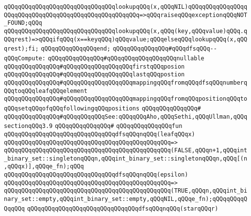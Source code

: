 \verb|qQQqqQQqqQQqqQQqqQQqqQQqqQQqqQQqlookupqQQq(x,qQQqNIL)qQQqqQQqqQQqqQQqqQQqqQQqqQQqqQQqqQQqqQQqqQQqqQQqqQQqqQQq=>qQQqraiseqQQqexceptionqQQqNOT_FOUND;qQQq|\newline
\verb|qQQqqQQqqQQqqQQqqQQqqQQqqQQqqQQqlookupqQQq(x,qQQq(key,qQQqvalue)qQQq.qQQqrest)=>qQQqifqQQq(x==keyqQQq)qQQqvalue;qQQqelseqQQqlookupqQQq(x,qQQqrest);fi;|\newline
\verb|qQQqqQQqqQQqqQQqend;|\newline
\newline
\verb|qQQqqQQqqQQqqQQq#qQQqdfsqQQq--qQQqCompute:|\newline
\verb|qQQqqQQqqQQqqQQq#qQQqqQQqqQQqqQQqqQQqnullable|\newline
\verb|qQQqqQQqqQQqqQQq#qQQqqQQqqQQqqQQqqQQqfirstqQQqposion|\newline
\verb|qQQqqQQqqQQqqQQq#qQQqqQQqqQQqqQQqqQQqlastqQQqpostion|\newline
\verb|qQQqqQQqqQQqqQQq#qQQqqQQqqQQqqQQqqQQqmappingqQQqfromqQQqdfsqQQqnumberqQQqtoqQQqleafqQQqelement|\newline
\verb|qQQqqQQqqQQqqQQq#qQQqqQQqqQQqqQQqqQQqmappingqQQqfromqQQqpositionqQQqtoqQQqsetqQQqofqQQqfollowingqQQqpositions|\newline
\verb|qQQqqQQqqQQqqQQq#|\newline
\verb|qQQqqQQqqQQqqQQq#qQQqqQQqqQQqSee:qQQqqQQqAho,qQQqSethi,qQQqUllman,qQQqsectionqQQq3.9|\newline
\verb|qQQqqQQqqQQqqQQq#|\newline
\verb|qQQqqQQqqQQqqQQqfun|\newline
\verb|qQQqqQQqqQQqqQQqqQQqqQQqqQQqqQQqdfsqQQqnqQQq(leafqQQqx)|\newline
\verb|qQQqqQQqqQQqqQQqqQQqqQQqqQQqqQQqqQQqqQQqqQQqqQQq=>|\newline
\verb|qQQqqQQqqQQqqQQqqQQqqQQqqQQqqQQqqQQqqQQqqQQqqQQq(FALSE,qQQqn+1,qQQqint_binary_set::singletonqQQqn,qQQqint_binary_set::singletonqQQqn,qQQq[(n,qQQqx)],qQQqe_fn);qQQq|\newline
\newline
\verb|qQQqqQQqqQQqqQQqqQQqqQQqqQQqqQQqdfsqQQqnqQQq(epsilon)|\newline
\verb|qQQqqQQqqQQqqQQqqQQqqQQqqQQqqQQqqQQqqQQqqQQqqQQq=>|\newline
\verb|qQQqqQQqqQQqqQQqqQQqqQQqqQQqqQQqqQQqqQQqqQQqqQQq(TRUE,qQQqn,qQQqint_binary_set::empty,qQQqint_binary_set::empty,qQQqNIL,qQQqe_fn);qQQqqQQqqQQqqQQq|\newline
\newline
\verb|qQQqqQQqqQQqqQQqqQQqqQQqqQQqqQQqdfsqQQqnqQQq(starqQQqr)|\newline
